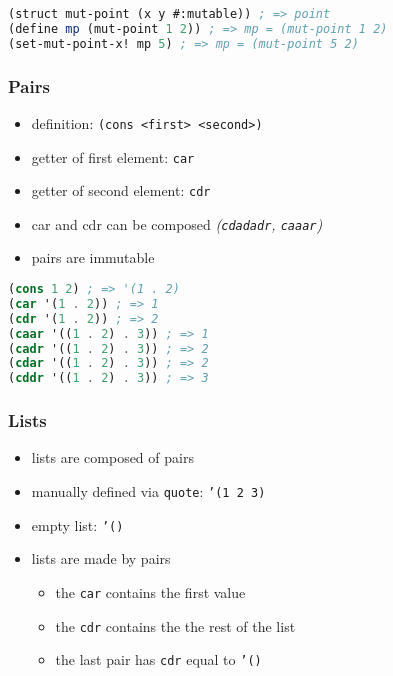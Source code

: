 \documentclass[a4paper,landscape,10pt]{article}
\begin{document}
\begin{multicols*}{2}
\begin{lstlisting}[language=Scheme]
(struct mut-point (x y #:mutable)) ; => point
(define mp (mut-point 1 2)) ; => mp = (mut-point 1 2)
(set-mut-point-x! mp 5) ; => mp = (mut-point 5 2)
\end{lstlisting}

  \subsubsection{Pairs}

  \begin{itemize}
    \item definition: \texttt{(cons <first> <second>)}
    \item getter of first element: \texttt{car}
    \item getter of second element: \texttt{cdr}
    \item car and cdr can be composed \textit{(\texttt{cdadadr}, \texttt{caaar})}
    \item pairs are immutable
  \end{itemize}

  \begin{lstlisting}[language=Scheme]
(cons 1 2) ; => '(1 . 2)
(car '(1 . 2)) ; => 1
(cdr '(1 . 2)) ; => 2
(caar '((1 . 2) . 3)) ; => 1
(cadr '((1 . 2) . 3)) ; => 2
(cdar '((1 . 2) . 3)) ; => 2
(cddr '((1 . 2) . 3)) ; => 3
\end{lstlisting}

  \subsubsection{Lists}

  \begin{itemize}
    \item lists are composed of pairs
    \item manually defined via \texttt{quote}: \texttt{'(1 2 3)}
    \item empty list: \texttt{'()}
    \item lists are made by pairs
          \begin{itemize} \item the \texttt{car} contains the first value
            \item the \texttt{cdr} contains the the rest of the list
            \item the last pair has \texttt{cdr} equal to \texttt{'()}
          \end{itemize}
  \end{itemize}


\end{multicols*}
\end{document}
